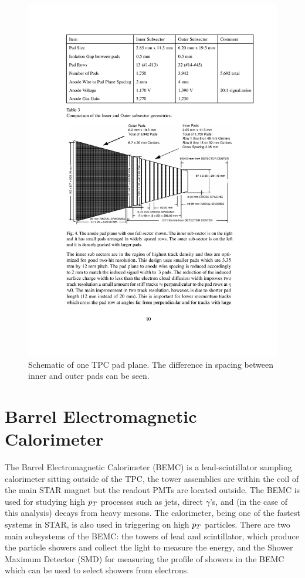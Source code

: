 \begin{figure}[htbp]
\begin{center}
\includegraphics[scale=1.0]{Plots/Detector/TPC_pad.pdf}
\end{center}
\caption[TPC Sector]{Schematic of one TPC pad plane. The difference in spacing between inner and outer pads can be seen.}
\label{fig:TPC_pad}
\end{figure}

\section{Barrel Electromagnetic Calorimeter}

The Barrel Electromagnetic Calorimeter (BEMC) is a lead-scintillator sampling calorimeter sitting outside of the TPC, the tower assemblies are within the coil of the main STAR magnet but the readout PMTs are located outside. The BEMC is used for studying high $p_{T}$ processes such as jets, direct $\gamma$'s, and (in the case of this analysis) decays from heavy mesons. The calorimeter, being one of the fastest systems in STAR, is also used in triggering on high $p_{T}$ particles. There are two main subsystems of the BEMC: the towers of lead and scintillator, which produce the particle showers and collect the light to measure the energy, and the Shower Maximum Detector (SMD) for measuring the profile of showers in the BEMC which can be used to select showers from electrons.

